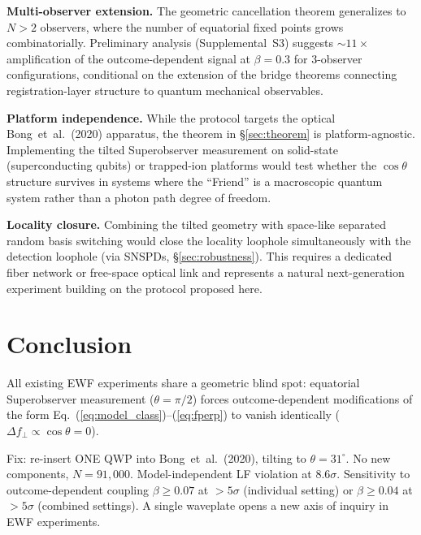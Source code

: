 \documentclass[twocolumn,aps,pra,superscriptaddress,floatfix,10pt]{revtex4-2}
\begin{document}
\textbf{Multi-observer extension.} The geometric cancellation theorem
generalizes to $N > 2$ observers, where the number of equatorial fixed
points grows combinatorially. Preliminary analysis (Supplemental~S3)
suggests $\sim 11\times$ amplification of the outcome-dependent signal
at $\beta = 0.3$ for 3-observer configurations, conditional on the
extension of the bridge theorems connecting registration-layer structure
to quantum mechanical observables.

\textbf{Platform independence.} While the protocol targets the optical
Bong~et~al.~(2020) apparatus, the theorem in \S\ref{sec:theorem} is
platform-agnostic. Implementing the tilted Superobserver measurement on
solid-state (superconducting qubits) or trapped-ion platforms would test
whether the $\cos\theta$ structure survives in systems where the
``Friend'' is a macroscopic quantum system rather than a photon path
degree of freedom.

\textbf{Locality closure.} Combining the tilted geometry with space-like
separated random basis switching would close the locality loophole
simultaneously with the detection loophole (via SNSPDs,
\S\ref{sec:robustness}). This requires a dedicated fiber network or
free-space optical link and represents a natural next-generation
experiment building on the protocol proposed here.

\section{Conclusion}
\label{sec:conclusion}

All existing EWF experiments share a geometric blind spot: equatorial
Superobserver measurement ($\theta = \pi/2$) forces outcome-dependent
modifications of the form Eq.~(\ref{eq:model_class})--(\ref{eq:fperp})
to vanish identically ($\Delta f_\perp \propto \cos\theta = 0$).

Fix: re-insert ONE QWP into Bong~et~al.~(2020), tilting to
$\theta = 31^\circ$. No new components, $N = 91{,}000$.
Model-independent LF violation at $8.6\sigma$. Sensitivity to
outcome-dependent coupling $\beta \ge 0.07$ at $>5\sigma$ (individual
setting) or $\beta \ge 0.04$ at $>5\sigma$ (combined settings). A
single waveplate opens a new axis of inquiry in EWF experiments.
\end{document}
